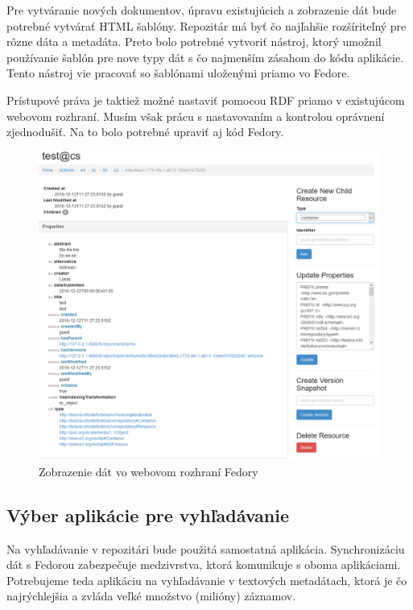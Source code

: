 \documentclass[thesis=M,slovak]{FITthesis}[2013/05/06]
\begin{document}
Pre vytváranie nových dokumentov, úpravu existujúcich a zobrazenie dát bude potrebné vytvárať HTML šablóny. Repozitár má byť čo najľahšie rozšíriteľný pre rôzne dáta a metadáta. Preto bolo potrebné vytvoriť nástroj, ktorý umožnil používanie šablón pre nove typy dát s čo najmenším zásahom do kódu aplikácie. Tento nástroj vie pracovať so šablónami uloženými priamo vo Fedore.

Prístupové práva je taktiež možné nastaviť pomocou RDF priamo v existujúcom webovom rozhraní. Musím však prácu s nastavovaním a kontrolou oprávnení zjednodušiť. Na to bolo potrebné upraviť aj kód Fedory.

\begin{figure}\centering
	\includegraphics[width=1.0\textwidth]{fedora/dcterms_vo_Fedore.png}
 	\caption[Zobrazenie dát vo webovom rozhraní Fedory]{Zobrazenie dát vo webovom rozhraní Fedory}\label{graphics:fedora}
\end{figure}

\subsection{Výber aplikácie pre vyhľadávanie}
Na vyhľadávanie v repozitári bude použitá samostatná aplikácia. Synchronizáciu dát s Fedorou zabezpečuje medzivrstva, ktorá komunikuje s oboma aplikáciami. Potrebujeme teda aplikáciu na vyhľadávanie v textových metadátach, ktorá je čo najrýchlejšia a zvláda veľké množstvo (milióny) záznamov.
\end{document}
